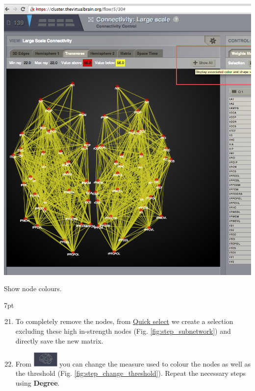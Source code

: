 \documentclass{tufte-handout}
\newenvironment{formal}{%
  \def\FrameCommand{%
    \hspace{1pt}%
    {\color{DarkBlue}\vrule width 2pt}%
    {\color{formalshade}\vrule width 4pt}%
    \colorbox{formalshade}%
  }%
  \MakeFramed{\advance\hsize-\width\FrameRestore}%
  \noindent\hspace{-4.55pt}%
  \begin{adjustwidth}{}{7pt}%
  \vspace{2pt}\vspace{2pt}%
}
{%
  \vspace{2pt}\end{adjustwidth}\endMakeFramed%
}
\begin{document}
\begin{marginfigure}
  \includegraphics[width=0.9\linewidth]{Handout_UI_ModellingStructuralLesions_ShowColourNodes}%
  \caption{Show node colours.}%
  \label{fig:step_12}%
\end{marginfigure}

\begin{formal}
  \begin{enumerate}[resume] %
  \setcounter{enumi}{20}
\item To completely remove the nodes, from \underline{Quick select} we create a selection excluding these high in-strength nodes (Fig. \ref{fig:step_subnetwork}) and directly save the new matrix. 
\item From \includegraphics[width=0.1\textwidth]{butt_brain_menu} 
 you can change the measure used to colour the nodes as well as the threshold  (Fig. \ref{fig:step_change_threshold}). Repeat the necessary steps using \textbf{Degree}. 

  \end{enumerate}
\end{formal}
\end{document}
